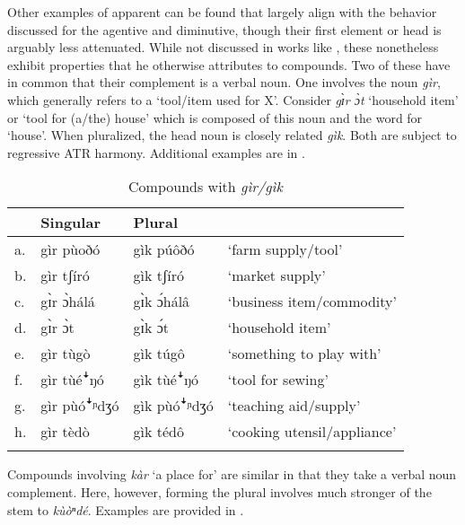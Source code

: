 \documentclass[output=paper,colorlinks,citecolor=brown]{langscibook}
\begin{document}
Other examples of apparent  can be found that largely align with the behavior discussed for the agentive and diminutive, though their first element or head is arguably less attenuated. While not discussed in works like \citet{Gregersen1961}, these nonetheless exhibit properties that he otherwise attributes to compounds. Two of these have in common that their complement is a verbal noun. One involves the noun \textit{gìr}, which generally refers to a `tool/item used for X'. Consider \textit{gɪ̀r ɔ̀t} `household item' or `tool for (a/the) house' which is composed of this noun and the word for `house'. When pluralized, the head noun is closely related \textit{gìk}. Both are subject to regressive ATR harmony. Additional examples are in .

\begin{table}
\caption{Compounds with \textit{gìr/gìk}}
\label{tab:GirCompound}
 \begin{tabular}{llll}
  \lsptoprule
& Singular & Plural &  \\
\midrule
a.&	gìr pùoðó	&gìk púôðó	&`farm supply/tool'\\
b.	&gìr tʃíró&	gìk tʃíró	&`market supply'\\
c.&	gɪ̀r ɔ̀hálá&	gɪ̀k ɔ́hálâ	&`business item/commodity'\\
d.&	gɪ̀r ɔ̀t	&gɪ̀k ɔ́t	&`household item'\\
e.&	gìr tùgò	&gìk túgô	&`something to play with'\\
f.&	gìr tùéꜜŋó	&gìk tùéꜜŋó	&`tool for sewing'\\
g.&	gìr pùóꜜᶮdʒó&	gìk pùóꜜᶮdʒó&	`teaching aid/supply'\\
h.&	gìr tèdò	&gìk tédô&	`cooking utensil/appliance'\\
  \lspbottomrule
 \end{tabular}
\end{table}   

Compounds  involving \textit{kàr} `a place for' are similar in that they take a verbal noun complement. Here, however, forming the plural involves much stronger  of the stem to \textit{kùòⁿdé}. Examples are provided in .
\end{document}
